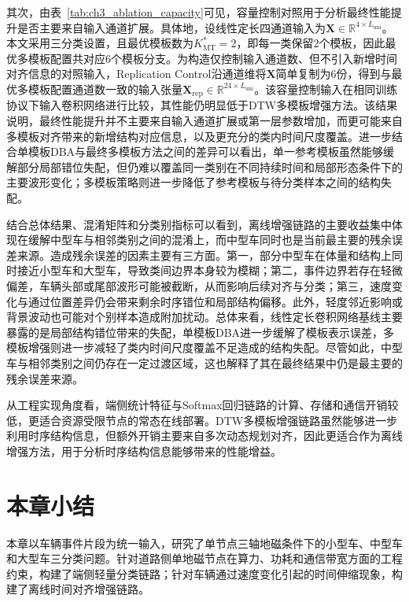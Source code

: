 \documentclass{xdupgthesis}
\begin{document}
其次，由表~\ref{tab:ch3_ablation_capacity}可见，容量控制对照用于分析最终性能提升是否主要来自输入通道扩展。具体地，设线性定长四通道输入为$\mathbf{X}\in\mathbb{R}^{4\times L_{\mathrm{uni}}}$。本文采用三分类设置，且最优模板数为$K_{\mathrm{MT}}^\ast=2$，即每一类保留2个模板，因此最优多模板配置共对应6个模板分支。为构造仅控制输入通道数、但不引入新增时间对齐信息的对照输入，Replication Control沿通道维将$\mathbf{X}$简单复制为6份，得到与最优多模板配置通道数一致的输入张量$\mathbf{X}_{\mathrm{rep}}\in\mathbb{R}^{24\times L_{\mathrm{uni}}}$。该容量控制输入在相同训练协议下输入卷积网络进行比较，其性能仍明显低于DTW多模板增强方法。该结果说明，最终性能提升并不主要来自输入通道扩展或第一层参数增加，而更可能来自多模板对齐带来的新增结构对应信息，以及更充分的类内时间尺度覆盖。进一步结合单模板DBA与最终多模板方法之间的差异可以看出，单一参考模板虽然能够缓解部分局部错位失配，但仍难以覆盖同一类别在不同持续时间和局部形态条件下的主要波形变化；多模板策略则进一步降低了参考模板与待分类样本之间的结构失配。

结合总体结果、混淆矩阵和分类别指标可以看到，离线增强链路的主要收益集中体现在缓解中型车与相邻类别之间的混淆上，而中型车同时也是当前最主要的残余误差来源。造成残余误差的因素主要有三方面。第一，部分中型车在体量和结构上同时接近小型车和大型车，导致类间边界本身较为模糊；第二，事件边界若存在轻微偏差，车辆头部或尾部波形可能被截断，从而影响后续对齐与分类；第三，速度变化与通过位置差异仍会带来剩余时序错位和局部结构偏移。此外，轻度邻近影响或背景波动也可能对个别样本造成附加扰动。总体来看，线性定长卷积网络基线主要暴露的是局部结构错位带来的失配，单模板DBA进一步缓解了模板表示误差，多模板增强则进一步减轻了类内时间尺度覆盖不足造成的结构失配。尽管如此，中型车与相邻类别之间仍存在一定过渡区域，这也解释了其在最终结果中仍是最主要的残余误差来源。

从工程实现角度看，端侧统计特征与Softmax回归链路的计算、存储和通信开销较低，更适合资源受限节点的常态在线部署。DTW多模板增强链路虽然能够进一步利用时序结构信息，但额外开销主要来自多次动态规划对齐，因此更适合作为离线增强方法，用于分析时序结构信息能够带来的性能增益。


\section{本章小结}
\label{sec:ch3_summary}

本章以车辆事件片段为统一输入，研究了单节点三轴地磁条件下的小型车、中型车和大型车三分类问题。针对道路侧单地磁节点在算力、功耗和通信带宽方面的工程约束，构建了端侧轻量分类链路；针对车辆通过速度变化引起的时间伸缩现象，构建了离线时间对齐增强链路。
\end{document}
